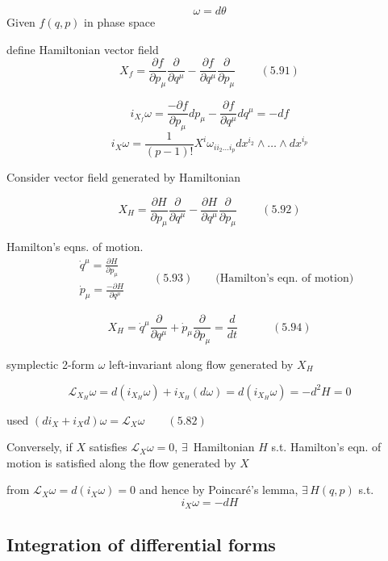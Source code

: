 \documentclass[twoside]{amsart}
\begin{document}
\[
\omega = d\theta
\]
Given $f(q,p)$ in phase space

define Hamiltonian vector field 
\[
X_f = \frac{ \partial f}{ \partial p_{\mu}} \frac{ \partial }{ \partial q^{\mu} } - \frac{ \partial f}{ \partial q^{\mu} } \frac{ \partial }{ \partial p_{\mu} } \quad \quad \, (5.91)
\]

\[
i_{X_f} \omega = \frac{ - \partial f}{ \partial p_{\mu}} dp_{\mu} - \frac{ \partial f}{ \partial q^{\mu} } dq^{\mu} = -df
\]
\[
i_X \omega = \frac{1}{ (p-1)!} X^i \omega_{ ii_2 \dots i_p} dx^{i_2} \wedge \dots \wedge dx^{i_p}
\]

Consider vector field generated by Hamiltonian

\begin{equation}
  X_H = \frac{ \partial H }{ \partial p_{\mu}} \frac{ \partial }{ \partial q^{\mu} } - \frac{ \partial H}{ \partial q^{\mu} } \frac{ \partial }{ \partial p_{\mu} } \quad \quad \, (5.92)
\end{equation}

Hamilton's eqns. of motion.
\[
\begin{aligned}
  & \dot{q}^{\mu} = \frac{ \partial H}{ \partial p_{\mu} } \\
  & \dot{p}_{\mu} = \frac{ - \partial H}{ \partial q^{\mu }} 
\end{aligned} \quad \quad \, (5.93) \quad \quad \text{(Hamilton's eqn. of motion)}
\]

\begin{equation}
X_H = \dot{q}^{\mu} \frac{ \partial }{ \partial q^{\mu} } + \dot{p}_{\mu} \frac{ \partial }{ \partial p_{\mu} } = \frac{d}{dt} \quad \quad \quad (5.94)
\end{equation}

symplectic 2-form $\omega$ left-invariant along flow generated by $X_H$

\[
\mathcal{L}_{X_H}\omega = d(i_{X_H} \omega ) + i_{X_H}(d\omega) = d(i_{X_H} \omega ) = - d^2 H = 0 
\]

used $(di_X + i_X d) \omega = \mathcal{L}_X \omega \quad \quad (5.82)$ 

Conversely, if $X$ satisfies $\mathcal{L}_X \omega=0$, $\exists \, $ Hamiltonian $H$ s.t. Hamilton's eqn. of motion is satisfied along the flow generated by $X$

from $\mathcal{L}_X \omega = d(i_X \omega ) = 0$ and hence by Poincar\'{e}'s lemma, $\exists \,  H(q,p)$ s.t. 
\[
i_X \omega = -dH
\]


\subsection{ Integration of differential forms }
\end{document}
